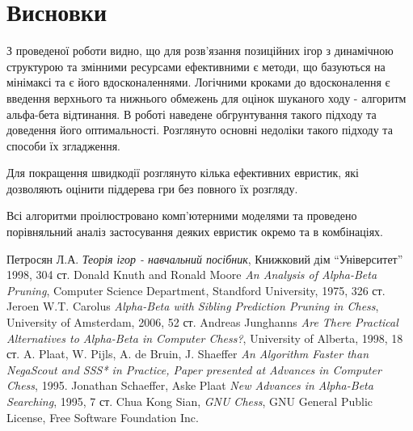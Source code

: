 \documentclass[12pt,a4paper]{article}
\begin{document}
\clearpage

\section{Висновки}

З проведеної роботи видно, що для розв'язання позиційних ігор з динамічною
структурою та змінними ресурсами ефективними є методи, що базуються на
мінімаксі та є його вдосконаленнями. Логічними кроками до вдосконалення є
введення верхнього та нижнього обмежень для оцінок шуканого ходу - алгоритм
альфа-бета відтинання. В роботі наведене обгрунтування такого підходу та
доведення його
оптимальності. Розглянуто основні недоліки такого підходу та способи їх
згладження.

Для покращення швидкодії розглянуто кілька ефективних евристик, які дозволяють
оцінити піддерева гри без повного їх розгляду.

Всі алгоритми проілюстровано комп'ютерними моделями та проведено порівняльний
аналіз застосування деяких евристик окремо та в комбінаціях.

\clearpage
{}

\begin{thebibliography}{99}
  Петросян Л.А. \emph{Теорія ігор - навчальний посібник},
    Книжковий дім ``Університет'' 1998, 304 ст.
  Donald Knuth and Ronald Moore \emph{An Analysis of
      Alpha-Beta Pruning}, Computer Science Department, Standford University,
    1975, 326 ст.
  Jeroen W.T. Carolus \emph{Alpha-Beta with Sibling
      Prediction Pruning in Chess}, University of Amsterdam, 2006, 52 ст.
  Andreas Junghanns \emph{Are There Practical
      Alternatives to Alpha-Beta in Computer Chess?}, University of Alberta,
    1998, 18 ст.
   A. Plaat, W. Pijls, A. de Bruin, J. Shaeffer \emph{An
      Algorithm Faster than NegaScout and SSS* in Practice, Paper presented at
      Advances in Computer Chess}, 1995.
  Jonathan Schaeffer, Aske Plaat \emph{New Advances in
      Alpha-Beta Searching}, 1995, 7 ст.
  Chua Kong Sian, \emph{GNU Chess}, GNU General Public License,
    Free Software Foundation Inc.

\end{thebibliography}
\end{document}
